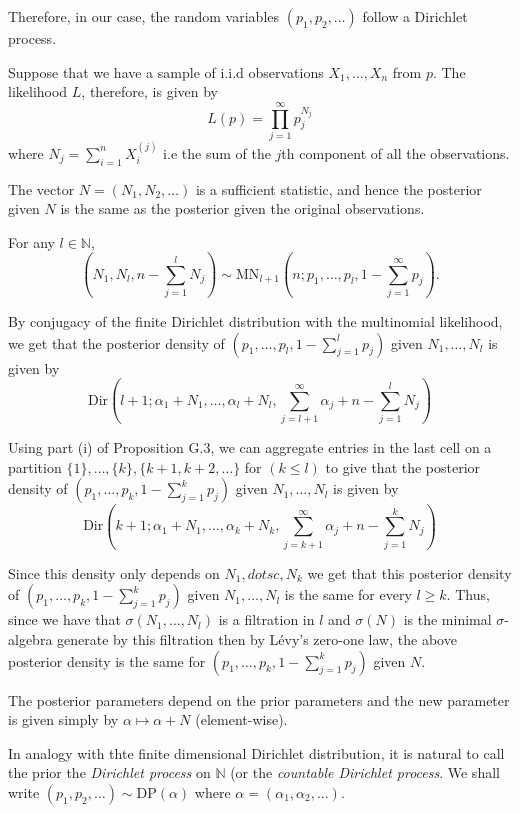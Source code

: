 \documentclass[a4paper,11pt]{article}
\theoremstyle{theorem}
\theoremstyle{definition}
\begin{document}
Therefore, in our case, the random variables $(p_1, p_2, \dotsc )$ follow a Dirichlet process.

Suppose that we have a sample of i.i.d observations $X_1, \dotsc, X_n$ from $p$.
The likelihood $L$, therefore, is given by
\[
L(p) = \prod_{j=1}^{\infty}{p_{j}^{N_j}}
\]
where $N_j = \sum_{i=1}^{n}{X_{i}^{(j)}}$ i.e the sum of the $j$th component of all the observations.

The vector $N = (N_1, N_2, \dotsc)$ is a sufficient statistic, and hence the posterior given $N$ is the same as the posterior given the original observations.

For any $l \in \mathbb{N}$,
\begin{equation} \label{multiNom}
\left( N_1, N_l, n - \sum_{j=1}^{l}{N_j}\right) \sim \text{MN}_{l+1}\left(n; p_1, \dotsc, p_l, 1 - \sum_{j=1}^{\infty}{p_j}\right).
\end{equation}

By conjugacy of the finite Dirichlet distribution with the multinomial likelihood, we get that the posterior density of $(p_1, \dotsc, p_l, 1- \sum_{j=1}^{l}{p_j})$ given $N_1, \dotsc, N_l$ is given by
\[
\text{Dir}\left(l+1; \alpha_1 + N_1, \dotsc, \alpha_l + N_l, \sum_{j=l+1}^{\infty}{\alpha_j} + n - \sum_{j=1}^{l}{N_j}\right)
\]

Using part (i) of Proposition G.3, we can aggregate entries in the last cell on a partition $\{1\}, \dotsc, \{k\}, \{k+1, k+2, \dotsc \}$ for $(k \leq l)$ to give that the posterior density of $\left(p_1, \dotsc, p_k, 1 - \sum_{j=1}^{k}{p_j}\right)$ given $N_1, \dotsc, N_l$ is given by
\[
\text{Dir}\left(k+1; \alpha_1 + N_1, \dotsc, \alpha_k + N_k, \sum_{j=k+1}^{\infty}{\alpha_j} + n - \sum_{j=1}^{k}{N_j}\right)
\]

Since this density only depends on $N_1, dotsc, N_k$ we get that this posterior density of $\left(p_1, \dotsc, p_k, 1 - \sum_{j=1}^{k}{p_j}\right)$ given $N_1, \dotsc, N_l$ is the same for every $l \geq k$. Thus, since we have that $\sigma(N_1, \dotsc, N_l)$ is a filtration in $l$ and $\sigma(N)$ is the minimal $\sigma$-algebra generate by this filtration then by L\'{e}vy's zero-one law, the above posterior density is the same for $\left(p_1, \dotsc, p_k, 1 - \sum_{j=1}^{k}{p_j}\right)$ given $N$.

The posterior parameters depend on the prior parameters and the new parameter is given simply by $\alpha \mapsto \alpha + N$ (element-wise).

In analogy with thte finite dimensional Dirichlet distribution, it is natural to call the prior the \textit{Dirichlet process} on $\mathbb{N}$ (or the \textit{countable Dirichlet process}. We shall write $(p_1, p_2, \dotsc) \sim \text{DP}(\alpha)$ where $\alpha = (\alpha_1, \alpha_2, \dotsc )$.
\end{document}
